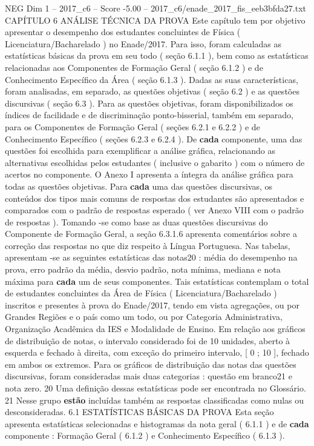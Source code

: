 \begin{textsample}{NEG Dim 1 – 2017\_c6 – Score -5.00 – 2017\_c6/enade\_2017\_fis\_eeb3bfda27.txt}  \label{ex:f1_neg_142}
CAPÍTULO 6 ANÁLISE TÉCNICA DA PROVA Este capítulo tem por objetivo apresentar o desempenho dos estudantes concluintes de Física ( Licenciatura/Bacharelado ) no Enade/2017.
Para isso, foram calculadas as estatísticas básicas da prova em seu todo ( seção 6.1.1 ), bem como as estatísticas relacionadas aos Componentes de Formação Geral ( seção 6.1.2 ) e de Conhecimento Específico da Área ( seção 6.1.3 ).
Dadas as suas características, foram analisadas, em separado, as questões objetivas ( seção 6.2 ) e as questões discursivas ( seção 6.3 ).
Para as questões objetivas, foram disponibilizados os índices de facilidade e de discriminação ponto-bisserial, também em separado, para os Componentes de Formação Geral ( seções 6.2.1 e 6.2.2 ) e de Conhecimento Específico ( seções 6.2.3 e 6.2.4 ).
De \textbf{cada} componente, uma das questões foi escolhida para exemplificar a análise gráfica, relacionando as alternativas escolhidas pelos estudantes ( inclusive o gabarito ) com o número de acertos no componente.
O Anexo I apresenta a íntegra da análise gráfica para todas as questões objetivas.
Para \textbf{cada} uma das questões discursivas, os conteúdos dos tipos mais comuns de respostas dos estudantes são apresentados e comparados com o padrão de respostas esperado ( ver Anexo VIII com o padrão de respostas ).
Tomando -se como base as duas questões discursivas do Componente de Formação Geral, a seção 6.3.1.6 apresenta comentários sobre a correção das respostas no que diz respeito à Língua Portuguesa.
Nas tabelas, apresentam -se as seguintes estatísticas das notas20 : média do desempenho na prova, erro padrão da média, desvio padrão, nota mínima, mediana e nota máxima para \textbf{cada} um de seus componentes.
Tais estatísticas contemplam o total de estudantes concluintes da Área de Física ( Licenciatura/Bacharelado ) inscritos e presentes à prova do Enade/2017, tendo em vista agregações, ou por Grandes Regiões e o país como um todo, ou por Categoria Administrativa, Organização Acadêmica da IES e Modalidade de Ensino.
Em relação aos gráficos de distribuição de notas, o intervalo considerado foi de 10 unidades, aberto à esquerda e fechado à direita, com exceção do primeiro intervalo, [ 0 ; 10 ], fechado em ambos os extremos.
Para os gráficos de distribuição das notas das questões discursivas, foram consideradas mais duas categorias : questão em branco21 e nota zero. 20 Uma definição dessas estatísticas pode ser encontrada no Glossário. 21 Nesse grupo \textbf{estão} incluídas também as respostas classificadas como nulas ou desconsideradas. 6.1 ESTATÍSTICAS BÁSICAS DA PROVA Esta seção apresenta estatísticas selecionadas e histogramas da nota geral ( 6.1.1 ) e de \textbf{cada} componente : Formação Geral ( 6.1.2 ) e Conhecimento Específico ( 6.1.3 ).

\end{textsample}
